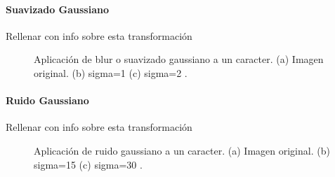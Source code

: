 		\paragraph{Suavizado Gaussiano}
		
			Rellenar con info sobre esta transformación
			
		\begin{figure}[htbp]
			\centering
			\caption[Suavizado Gaussiano de un caracter]{Aplicación de blur o suavizado gaussiano a un caracter. (a) Imagen original. (b) sigma=1  (c) sigma=2 .}
			\label{fig: Suavizado Gaussiano}
		\end{figure}				
			
			
		\paragraph{Ruido Gaussiano}			
			
			Rellenar con info sobre esta transformación
			
		\begin{figure}[htbp]
			\centering
			\caption[Ruido Gaussiano en un caracter]{Aplicación de ruido gaussiano a un caracter. (a) Imagen original. (b) sigma=15  (c) sigma=30 .}
			\label{fig: Ruido Gaussiano}
		\end{figure}
			
